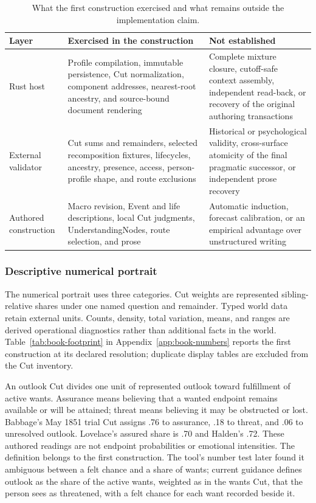 \documentclass[11pt,a4paper]{article}
\begin{document}
\begin{table}[htbp]
\centering
\small
\begin{tabularx}{\textwidth}{@{}p{}YY@{}}
\toprule
Layer & Exercised in the construction & Not established \\
\midrule
Rust host & Profile compilation, immutable persistence, Cut normalization,
component addresses, nearest-root ancestry, and source-bound document rendering &
Complete mixture closure, cutoff-safe context assembly, independent read-back,
or recovery of the original authoring transactions \\
External validator & Cut sums and remainders, selected recomposition fixtures,
lifecycles, ancestry, presence, access, person-profile shape, and route
exclusions & Historical or psychological validity, cross-surface atomicity of
the final pragmatic successor, or independent prose recovery \\
Authored construction & Macro revision, Event and life descriptions, local Cut
judgments, UnderstandingNodes, route selection, and prose & Automatic induction,
forecast calibration, or an empirical advantage over unstructured writing \\
\bottomrule
\end{tabularx}
\caption{What the first construction exercised and what remains outside the
implementation claim.}
\label{tab:book-enforcement-boundary}
\end{table}

\subsubsection{Descriptive numerical portrait}
\label{sec:book-portrait}

The numerical portrait uses three categories. Cut weights are represented
sibling-relative shares under one named question and remainder. Typed world
data retain external units. Counts, density, total variation, means, and ranges
are derived operational diagnostics rather than additional facts in the world.
Table~\ref{tab:book-footprint} in Appendix~\ref{app:book-numbers} reports the first
construction at its declared resolution; duplicate display tables are excluded
from the Cut inventory.

An outlook Cut divides one unit of represented outlook toward fulfillment of
active wants. Assurance means believing that a wanted endpoint remains
available or will be attained; threat means believing it may be obstructed or
lost. Babbage's May 1851 trial Cut assigns .76 to assurance, .18 to threat, and
.06 to unresolved outlook. Lovelace's assured share is .70 and Halden's .72.
These authored readings are not endpoint probabilities or emotional intensities.
The definition belongs to the first construction. The tool's number test later
found it ambiguous between a felt chance and a share of wants; current guidance
defines outlook as the share of the active wants, weighted as in the wants Cut, that the
person sees as threatened, with a felt chance for each want recorded beside it.
\end{document}
